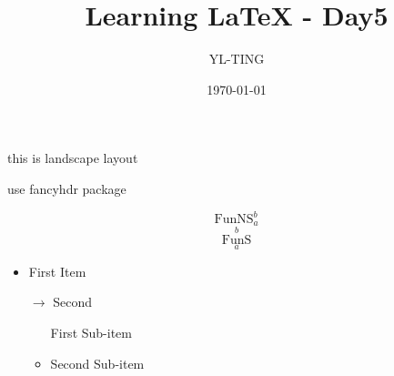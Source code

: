 \documentclass{article}
\author{YL-TING}
\title{Learning LaTeX - Day5}
\date{\today}
\theoremstyle{plain}
\theoremstyle{definition}
\theoremstyle{remark}
\newcommand{\FunNS}{\operatorname{FunNS}} %
\newcommand{\FunS}{\operatorname*{FunS}} %
\begin{document}
    \maketitle
    \newpage

    \begin{landscape}
        {\Large this is landscape layout}
    \end{landscape}

    \newpage
    use fancyhdr package 
    \pagestyle{fancy}



    \newpage


    \[ \FunNS_a^b \]
    \[ \FunS_a^b \]



    \begin{itemize}
        \item First Item
        \item[$\rightarrow$] Second 
        \begin{itemize}
            \item[] First Sub-item
            \item Second Sub-item
        \end{itemize}
    \end{itemize}
\end{document}

